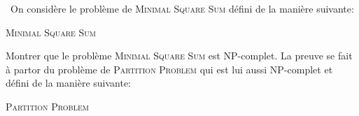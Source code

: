 \begin{td-exo}\, %
	On considère le problème de \textsc{Minimal Square Sum} défini de la manière suivante:
	
	\begin{problem}{\textsc{Minimal Square Sum}}

	\end{problem}

	Montrer que le problème \textsc{Minimal Square Sum} est NP-complet.
	La preuve se fait à partor du problème de \textsc{Partition Problem} qui est lui aussi NP-complet et défini de la manière suivante:

	\begin{problem}{\textsc{Partition Problem}}

	\end{problem}
\end{td-exo}

